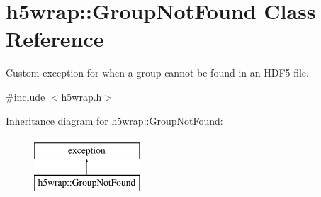 \hypertarget{classh5wrap_1_1_group_not_found}{\section{h5wrap\-:\-:Group\-Not\-Found Class Reference}
\label{classh5wrap_1_1_group_not_found}
}


Custom exception for when a group cannot be found in an H\-D\-F5 file.  




{\ttfamily \#include $<$h5wrap.\-h$>$}

Inheritance diagram for h5wrap\-:\-:Group\-Not\-Found\-:\begin{figure}[H]
\begin{center}
\leavevmode
\includegraphics[height=2.000000cm]{classh5wrap_1_1_group_not_found}
\end{center}
\end{figure}
